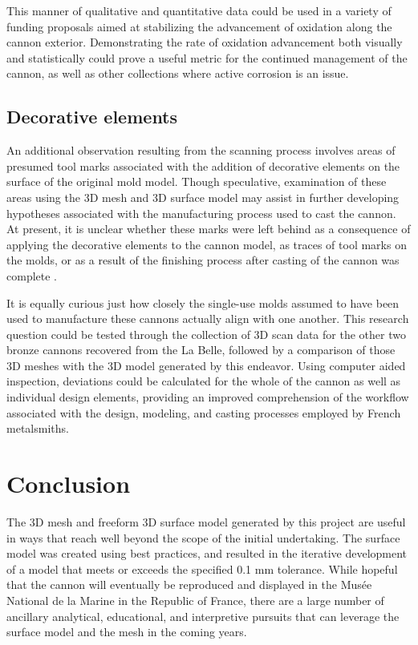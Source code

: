 \documentclass[review]{elsarticle}
\begin{document}
This manner of qualitative and quantitative data could be used in a variety of funding proposals aimed at stabilizing the advancement of oxidation along the cannon exterior. Demonstrating the rate of oxidation advancement both visually and statistically could prove a useful metric for the continued management of the cannon, as well as other collections where active corrosion is an issue. 

\subsection*{Decorative elements}

An additional observation resulting from the scanning process involves areas of presumed tool marks associated with the addition of decorative elements on the surface of the original mold model. Though speculative, examination of these areas using the 3D mesh and 3D surface model may assist in further developing hypotheses associated with the manufacturing process used to cast the cannon. At present, it is unclear whether these marks were left behind as a consequence of applying the decorative elements to the cannon model, as traces of tool marks on the molds, or as a result of the finishing process after casting of the cannon was complete \cite[358]{RN5763}.

It is equally curious just how closely the single-use molds assumed to have been used to manufacture these cannons actually align with one another. This research question could be tested through the collection of 3D scan data for the other two bronze cannons recovered from the La Belle, followed by a comparison of those 3D meshes with the 3D model generated by this endeavor. Using computer aided inspection, deviations could be calculated for the whole of the cannon as well as individual design elements, providing an improved comprehension of the workflow associated with the design, modeling, and casting processes employed by French metalsmiths.

\section*{Conclusion}

The 3D mesh and freeform 3D surface model generated by this project are useful in ways that reach well beyond the scope of the initial undertaking. The surface model was created using best practices, and resulted in the iterative development of a model that meets or exceeds the  specified 0.1 mm tolerance. While hopeful that the cannon will eventually be reproduced and displayed in the Musée National de la Marine in the Republic of France, there are a large number of ancillary analytical, educational, and interpretive pursuits that can leverage the surface model and the mesh in the coming years. 
\end{document}
